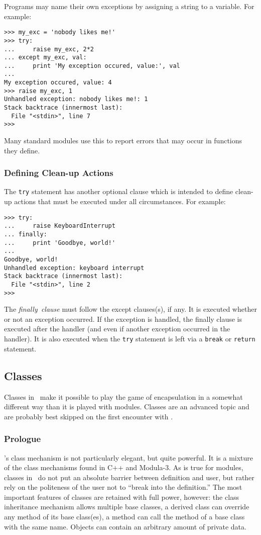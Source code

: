 Programs may name their own exceptions by assigning a string to a
variable.
For example:
\bcode\begin{verbatim}
>>> my_exc = 'nobody likes me!'
>>> try:
...     raise my_exc, 2*2
... except my_exc, val:
...     print 'My exception occured, value:', val
...
My exception occured, value: 4
>>> raise my_exc, 1
Unhandled exception: nobody likes me!: 1
Stack backtrace (innermost last):
  File "<stdin>", line 7
>>>
\end{verbatim}\ecode
Many standard modules use this to report errors that may occur in
functions they define.

\subsubsection{Defining Clean-up Actions}

The {\tt try} statement has another optional clause which is intended to
define clean-up actions that must be executed under all circumstances.
For example:
\bcode\begin{verbatim}
>>> try:
...     raise KeyboardInterrupt
... finally:
...     print 'Goodbye, world!'
...
Goodbye, world!
Unhandled exception: keyboard interrupt
Stack backtrace (innermost last):
  File "<stdin>", line 2
>>>
\end{verbatim}\ecode
The
{\em finally\ clause}
must follow the except clauses(s), if any.
It is executed whether or not an exception occurred.
If the exception is handled, the finally clause is executed after the
handler (and even if another exception occurred in the handler).
It is also executed when the {\tt try} statement is left via a
{\tt break} or {\tt return} statement.

\subsection{Classes}

Classes in \Python\ make it possible to play the game of encapsulation in a
somewhat different way than it is played with modules.
Classes are an advanced topic and are probably best skipped on the first
encounter with \Python.

\subsubsection{Prologue}

\Python's class mechanism is not particularly elegant, but quite powerful.
It is a mixture of the class mechanisms found in C++ and Modula-3.
As is true for modules, classes in \Python\ do not put an absolute barrier
between definition and user, but rather rely on the politeness of the
user not to ``break into the definition.''
The most important features of classes are retained with full power,
however: the class inheritance mechanism allows multiple base classes,
a derived class can override any method of its base class(es), a method
can call the method of a base class with the same name.
Objects can contain an arbitrary amount of private data.

